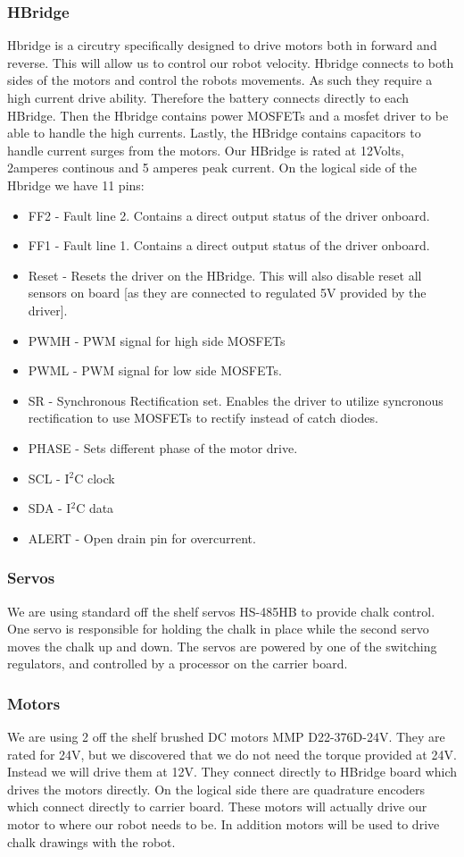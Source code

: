 \documentclass[12pt]{article}
\begin{document}
 \subsubsection{HBridge}
 Hbridge is a circutry specifically designed to drive motors both in forward and reverse. This will allow us to control our robot velocity. Hbridge connects to both sides of the motors and control the robots movements. As such they require a high current drive ability. Therefore the battery connects directly to each HBridge. Then the Hbridge contains power MOSFETs and a mosfet driver to be able to handle the high currents. Lastly, the HBridge contains capacitors to handle current surges from the motors. Our HBridge is rated at 12Volts, 2amperes continous and 5 amperes peak current.  On the logical side of the Hbridge we have 11 pins:
 \begin{itemize}
  \item FF2 - Fault line 2. Contains a direct output status of the driver onboard.
  \item FF1 - Fault line 1. Contains a direct output status of the driver onboard.
  \item Reset - Resets the driver on the HBridge. This will also disable reset all sensors on board [as they are connected to regulated 5V provided by the driver].
  \item PWMH - PWM signal for high side MOSFETs
  \item PWML - PWM signal for low side MOSFETs.
  \item SR - Synchronous Rectification set. Enables the driver to utilize syncronous rectification to use MOSFETs to rectify instead of catch diodes.
  \item PHASE - Sets different phase of the motor drive.
  \item SCL - I$^{\textrm{2}}$C  clock
  \item SDA - I$^{\textrm{2}}$C data
  \item ALERT - Open drain pin for overcurrent.
  \end{itemize}
  \subsubsection{Servos}
     We are using standard off the shelf servos HS-485HB to provide chalk control. One servo is responsible for holding the chalk in place while the second servo moves the chalk up and down. The servos are powered by one of the switching regulators, and controlled by a processor on the carrier board.
     \subsubsection{Motors}
     We are using 2 off the shelf brushed DC motors MMP D22-376D-24V. They are rated for 24V, but we discovered that we do not need the torque provided at 24V. Instead we will drive them at 12V. They connect directly to HBridge board which drives the motors directly.  On the logical side there are quadrature encoders which connect directly to carrier board. These motors will actually drive our motor to where our robot needs to be. In addition motors will be used to drive chalk drawings with the robot.
\end{document}
